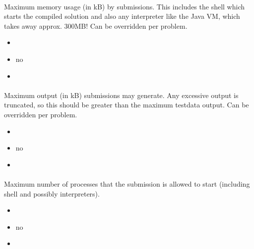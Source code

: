 \documentclass[a4paper,10pt,english,openany]{sphinxmanual}
\begin{document}
\paragraph{}
\label{\detokenize{configuration-reference:memory-limit}}
\sphinxAtStartPar
Maximum memory usage (in kB) by submissions. This includes the shell which starts the compiled solution and also any interpreter like the Java VM, which takes away approx. 300MB! Can be overridden per problem.
\begin{itemize}
\item {} 
\sphinxAtStartPar
{} 

\item {} 
\sphinxAtStartPar
{} no

\item {} 
\sphinxAtStartPar
{} 

\end{itemize}


\paragraph{}
\label{\detokenize{configuration-reference:output-limit}}
\sphinxAtStartPar
Maximum output (in kB) submissions may generate. Any excessive output is truncated, so this should be greater than the maximum testdata output. Can be overridden per problem.
\begin{itemize}
\item {} 
\sphinxAtStartPar
{} 

\item {} 
\sphinxAtStartPar
{} no

\item {} 
\sphinxAtStartPar
{} 

\end{itemize}


\paragraph{}
\label{\detokenize{configuration-reference:process-limit}}
\sphinxAtStartPar
Maximum number of processes that the submission is allowed to start (including shell and possibly interpreters).
\begin{itemize}
\item {} 
\sphinxAtStartPar
{} 

\item {} 
\sphinxAtStartPar
{} no

\item {} 
\sphinxAtStartPar
{} 

\end{itemize}
\end{document}

